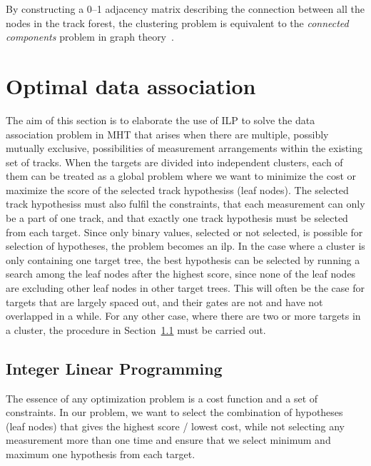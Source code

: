 By constructing a 0--1 adjacency matrix describing the connection between all the nodes in the \gls{track forest}, the clustering problem is equivalent to the \emph{connected components} problem in graph theory~\cite{Chen2015}.

\section{Optimal data association}\label{sec:optim_data_association}
The aim of this section is to elaborate the use of ILP to solve the data association problem in MHT that arises when there are multiple, possibly mutually exclusive, possibilities of measurement arrangements within the existing set of tracks. When the targets are divided into independent clusters, each of them can be treated as a global problem where we want to minimize the cost or maximize the score of the selected \glspl{track hypothesis} (leaf nodes). The selected \glspl{track hypothesis} must also fulfil the constraints, that each measurement can only be a part of one track, and that exactly one track hypothesis must be selected from each target. Since only binary values, selected or not selected, is possible for selection of hypotheses, the problem becomes an \gls{ilp}. In the case where a cluster is only containing one target tree, the best hypothesis can be selected by running a search among the leaf nodes after the highest score, since none of the leaf nodes are excluding other leaf nodes in other target trees. This will often be the case for targets that are largely spaced out, and their gates are not and have not overlapped in a while. For any other case, where there are two or more targets in a cluster, the procedure in Section~\ref{subsec:integer_linear_programming} must be carried out.

\subsection{Integer Linear Programming}\label{subsec:integer_linear_programming}
The essence of any optimization problem is a cost function and a set of constraints. In our problem, we want to select the combination of hypotheses (leaf nodes) that gives the highest score / lowest cost, while not selecting any measurement more than one time and ensure that we select minimum and maximum one hypothesis from each target. 


